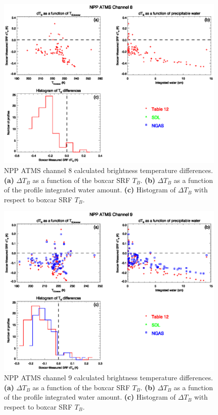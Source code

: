 \begin{figure}[H]
  \centering
  \includegraphics[scale=1]{graphics/dtb/atms_npp.ch8.TbStats.eps}
  \caption{NPP ATMS channel 8 calculated brightness temperature differences. \textbf{(a)} $\Delta T_B$ as a function of the boxcar SRF $T_B$. \textbf{(b)} $\Delta T_B$ as a function of the profile integrated water amount. \textbf{(c)} Histogram of $\Delta T_B$ with respect to boxcar SRF $T_B$.}
  \label{fig:atms_npp.ch8.dtb}
\end{figure}

\begin{figure}[H]
  \centering
  \includegraphics[scale=1]{graphics/dtb/atms_npp.ch9.TbStats.eps}
  \caption{NPP ATMS channel 9 calculated brightness temperature differences. \textbf{(a)} $\Delta T_B$ as a function of the boxcar SRF $T_B$. \textbf{(b)} $\Delta T_B$ as a function of the profile integrated water amount. \textbf{(c)} Histogram of $\Delta T_B$ with respect to boxcar SRF $T_B$.}
  \label{fig:atms_npp.ch9.dtb}
\end{figure}

